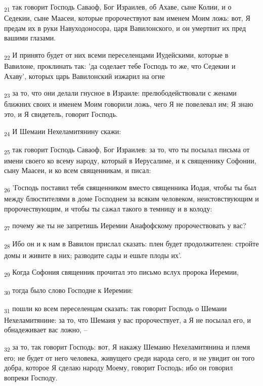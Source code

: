 \begin{tcolorbox}
\textsubscript{21} так говорит Господь Саваоф, Бог Израилев, об Ахаве, сыне Колии, и о Седекии, сыне Маасеи, которые пророчествуют вам именем Моим ложь: вот, Я предам их в руки Навуходоносора, царя Вавилонского, и он умертвит их пред вашими глазами.
\end{tcolorbox}
\begin{tcolorbox}
\textsubscript{22} И принято будет от них всеми переселенцами Иудейскими, которые в Вавилоне, проклинать так: 'да соделает тебе Господь то же, что Седекии и Ахаву', которых царь Вавилонский изжарил на огне
\end{tcolorbox}
\begin{tcolorbox}
\textsubscript{23} за то, что они делали гнусное в Израиле: прелюбодействовали с женами ближних своих и именем Моим говорили ложь, чего Я не повелевал им; Я знаю это, и Я свидетель, говорит Господь.
\end{tcolorbox}
\begin{tcolorbox}
\textsubscript{24} И Шемаии Нехеламитянину скажи:
\end{tcolorbox}
\begin{tcolorbox}
\textsubscript{25} так говорит Господь Саваоф, Бог Израилев: за то, что ты посылал письма от имени своего ко всему народу, который в Иерусалиме, и к священнику Софонии, сыну Маасеи, и ко всем священникам, и писал:
\end{tcolorbox}
\begin{tcolorbox}
\textsubscript{26} 'Господь поставил тебя священником вместо священника Иодая, чтобы ты был между блюстителями в доме Господнем за всяким человеком, неистовствующим и пророчествующим, и чтобы ты сажал такого в темницу и в колоду:
\end{tcolorbox}
\begin{tcolorbox}
\textsubscript{27} почему же ты не запретишь Иеремии Анафофскому пророчествовать у вас?
\end{tcolorbox}
\begin{tcolorbox}
\textsubscript{28} Ибо он и к нам в Вавилон прислал сказать: плен будет продолжителен: стройте домы и живите в них; разводите сады и ешьте плоды их'.
\end{tcolorbox}
\begin{tcolorbox}
\textsubscript{29} Когда Софония священник прочитал это письмо вслух пророка Иеремии,
\end{tcolorbox}
\begin{tcolorbox}
\textsubscript{30} тогда было слово Господне к Иеремии:
\end{tcolorbox}
\begin{tcolorbox}
\textsubscript{31} пошли ко всем переселенцам сказать: так говорит Господь о Шемаии Нехеламитянине: за то, что Шемаия у вас пророчествует, а Я не посылал его, и обнадеживает вас ложно, --
\end{tcolorbox}
\begin{tcolorbox}
\textsubscript{32} за то, так говорит Господь: вот, Я накажу Шемаию Нехеламитянина и племя его; не будет от него человека, живущего среди народа сего, и не увидит он того добра, которое Я сделаю народу Моему, говорит Господь; ибо он говорил вопреки Господу.
\end{tcolorbox}
